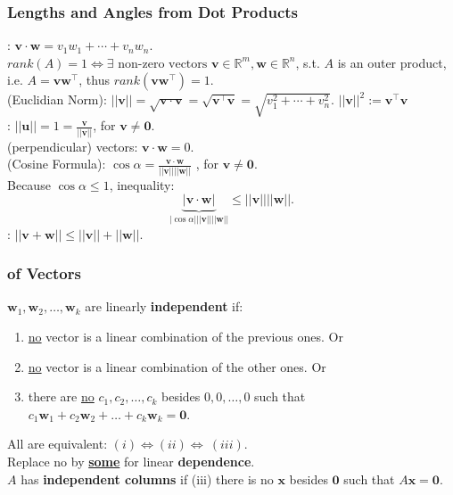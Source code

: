 \subsubsection{Lengths and Angles from Dot Products}
:
$\mathbf{v} \cdot \mathbf{w} = v_1w_1 + \cdots + v_nw_n$. \\
 $rank(A)=1 \iff \exists \text{ non-zero vectors }\mathbf{v} \in \mathbb{R}^m, \mathbf{w} \in \mathbb{R}^n$, s.t. $A$ is an outer product, i.e. $A=\mathbf{vw}^\top$, thus $rank(\mathbf{vw}^\top)=1$.
\\[2.22mm]
 (Euclidian Norm): $||\mathbf{v}|| = \sqrt{\mathbf{v} \cdot \mathbf{v}} = \sqrt{\mathbf{v} ^\top \mathbf{v}} = \sqrt{v^2_1 + \cdots + v^2_n}$. $||\mathbf{v}||^2:=\mathbf{v}^\top \mathbf{v}$\\
\textbf{}: $||\mathbf{u}||=1=\frac{\mathbf{v}}{||\mathbf{v}||}$, for $\mathbf{v} \ne \mathbf{0}$.
\\[2.22mm]
 (perpendicular) vectors: $\mathbf{v} \cdot \mathbf{w} = 0$. \\
 (Cosine Formula): $\cos{\alpha} = \frac{\mathbf{v} \cdot \mathbf{w}}{||\mathbf{v}||||\mathbf{w}||}$
, for $\mathbf{v} \ne \mathbf{0}$. \\
Because $\cos{\alpha} \le 1$,  inequality:
$$\underbrace{|\mathbf{v} \cdot \mathbf{w}|}_{|\cos{\alpha}|||\mathbf{v}||||\mathbf{w}||}
\le ||\mathbf{v}||||\mathbf{w}||.$$
: $||\mathbf{v} + \mathbf{w}|| \le ||\mathbf{v}|| + ||\mathbf{w}||$.

\subsubsection{ of Vectors}
$\mathbf{w}_1, \mathbf{w}_2, \dots , \mathbf{w}_k$ are linearly \textbf{independent} if:
\begin{enumerate}[label=(\roman*)]
\item 
    \underline{no} vector is a linear combination of the previous ones. Or
\item 
    \underline{no} vector is a linear combination of the other ones. Or
\item 
    there are \underline{no} $ c_1, c_2, \dots , c_k$ besides $0, 0, \dots , 0$ such that
    $c_1\mathbf{w}_1 + c_2\mathbf{w}_2 + \dots + c_k\mathbf{w}_k = \mathbf{0}.$
\end{enumerate}
All are equivalent: $(i) \Leftrightarrow (ii) \Leftrightarrow \ (iii)$. \\
Replace no by \textbf{\underline{some}} for linear \textbf{dependence}.
\\[2.22mm]
$A$ has \textbf{independent columns} if (iii) there is no $\mathbf{x}$ besides $\mathbf{0}$ such that $A\mathbf{x} = \mathbf{0}$.

